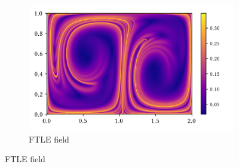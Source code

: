 \begin{figure}[htpb]
        \centering
    \begin{subfigure}{\textwidth}
        \centering
        \includegraphics{figures/ftle_l2/ftle.png}
        \caption[]{FTLE field}
        \label{fig:ftle_l2_ftle}
    \end{subfigure}


\end{figure}
